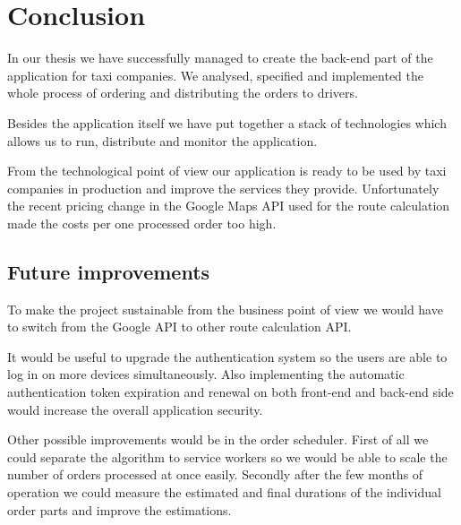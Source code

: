 \chapter*{Conclusion}
In our thesis we have successfully managed to create the back-end part of the application for taxi companies. We analysed, specified and implemented the whole process of ordering and distributing the orders to drivers. 

Besides the application itself we have put together a stack of technologies which allows us to run, distribute and monitor the application.

From the technological point of view our application is ready to be used by taxi companies in production and improve the services they provide. Unfortunately the recent pricing change in the Google Maps API used for the route calculation made the costs per one processed order too high.

\section{Future improvements}
To make the project sustainable from the business point of view we would have to switch from the Google API to other route calculation API. 

It would be useful to upgrade the authentication system so the users are able to log in on more devices simultaneously. Also implementing the automatic authentication token expiration and renewal on both front-end and back-end side would increase the overall application security.

Other possible improvements would be in the order scheduler. First of all we could separate the algorithm to service workers so we would be able to scale the number of orders processed at once easily. Secondly after the few months of operation we could measure the estimated and final durations of the individual order parts and improve the estimations.